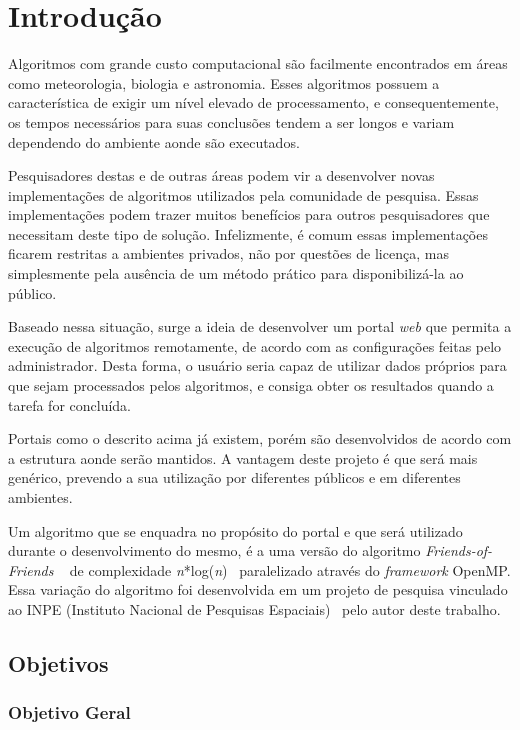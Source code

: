 \documentclass[tg]{mdtufsm}
\begin{document}
\chapter{Introdução}

Algoritmos com grande custo computacional são facilmente encontrados em áreas como meteorologia, biologia e astronomia. Esses algoritmos possuem a característica de exigir um nível elevado de processamento, e consequentemente, os tempos necessários para suas conclusões tendem a ser longos e variam dependendo do ambiente aonde são executados.

Pesquisadores destas e de outras áreas podem vir a desenvolver novas implementações de algoritmos utilizados pela comunidade de pesquisa. Essas implementações podem trazer muitos benefícios para outros pesquisadores que necessitam deste tipo de solução. Infelizmente, é comum essas implementações ficarem restritas a ambientes privados, não por questões de licença, mas simplesmente pela ausência de um método prático para disponibilizá-la ao público.

Baseado nessa situação, surge a ideia de desenvolver um portal \emph{web} que permita a execução de algoritmos remotamente, de acordo com as configurações feitas pelo administrador. Desta forma, o usuário seria capaz de utilizar dados próprios para que sejam processados pelos algoritmos, e consiga obter os resultados quando a tarefa for concluída.

Portais como o descrito acima já existem, porém são desenvolvidos de acordo com a estrutura aonde serão mantidos. A vantagem deste projeto é que será mais genérico, prevendo a sua utilização por diferentes públicos e em diferentes ambientes.

Um algoritmo que se enquadra no propósito do portal e que será utilizado durante o desenvolvimento do mesmo, é a uma versão do algoritmo \emph{Friends-of-Friends} \cite{friendsalg}~ de complexidade \emph{n}*log(\emph{n})~ paralelizado através do \emph{framework} OpenMP. Essa variação do algoritmo foi desenvolvida em um projeto de pesquisa vinculado ao INPE (Instituto Nacional de Pesquisas Espaciais)~ pelo autor deste trabalho.

\section{Objetivos}

\subsection{Objetivo Geral}
\end{document}
